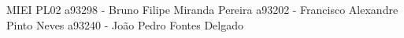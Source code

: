 M\+I\+EI P\+L02 a93298 -\/ Bruno Filipe Miranda Pereira a93202 -\/ Francisco Alexandre Pinto Neves a93240 -\/ João Pedro Fontes Delgado 